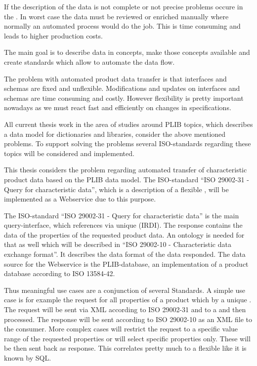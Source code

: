 If the description of the data is not complete or not precise problems occure in the . In worst case the data must be reviewed or enriched manually where normally an automated process would do the job. This is time consuming and leads to higher production costs.   

The main goal is to describe data in concepts, make those concepts available and create standards which allow to automate the data flow.  

The problem with automated product data transfer is that interfaces and schemas are fixed and unflexible. Modifications and updates on interfaces and schemas are time consuming and costly. However flexibility is pretty important nowadays as we must react fast and efficiently on changes in specifications. 
 
All current thesis work in the area of studies around \gls{PLIB} topics, which describes a data model for dictionaries and libraries, consider the above mentioned problems. To support solving the problems several ISO-standards regarding these topics will be considered and implemented. 

This thesis considers the problem regarding automated transfer of characteristic product data based on the \gls{PLIB} data model. The ISO-standard \enquote{ISO 29002-31 - Query for characteristic data}, which is a description of a flexible , will be implemented as a \gls{Webservice} due to this purpose. 

The ISO-standard \enquote{ISO 29002-31 - Query for characteristic data} is the main query-interface, which references  via unique  (IRDI).
The response contains the data of the properties of the requested product data. An ontology is needed for that as well which will be described in \enquote{ISO 29002-10 - Characteristic data exchange format}. It describes the data format of the data responded. The data source for the \gls{Webservice} is the PLIB-database, an implementation of a product database according to ISO 13584-42. 

Thus meaningful use cases are a conjunction of several Standards. 
A simple use case is for example the request for all properties of a product which by a unique . The request will be sent via XML according to ISO 29002-31 and to a  and then processed. The response will be sent according to ISO 29002-10 as an XML file to the consumer. More complex cases will restrict the request to a specific value range of the requested properties or will select specific properties only. These will be then sent back as response. This  correlates pretty much to a flexible  like it is known by SQL. 

